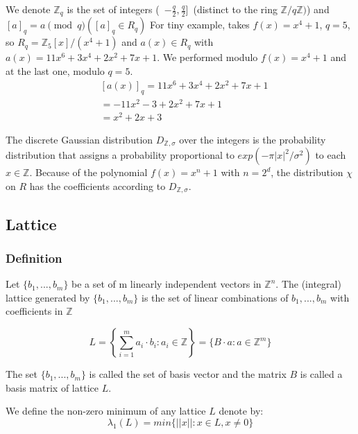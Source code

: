 \documentclass[A4paper,12pt]{article}
\begin{document}
We denote $\mathbb{Z}_q$ is the set of integers (\ $-\frac{q}{2},\frac{q}{2}$]\ (distinct to the ring $\mathbb{Z}/q\mathbb{Z})$) and $[a]_q = a \pmod q ([a]_q  \in R_q)$
For tiny example, takes $f(x) = x^4 + 1$, $q = 5$, so $R_q = \mathbb{Z}_5[x]/(x^4 + 1)$ and $a(x) \in R_q$ with $a(x) = 11x^6 + 3x^4 + 2x^2 + 7x + 1$. We performed modulo $f(x) = x^4 + 1$ and at the last one, modulo $q = 5$.
\begin{equation*}
	\begin{aligned}
	&[a(x)]_q = 11x^6 + 3x^4 + 2x^2 + 7x + 1\\
	&= -11x^2 -3 + 2x^2 + 7x + 1\\
	&= x^2 + 2x + 3
	\end{aligned}
\end{equation*}

The discrete Gaussian distribution $D_{\mathbb{Z}, \sigma}$ over the integers is the probability distribution that assigns a probability proportional to $exp(-\pi|x|^2/\sigma^2)$ to each $x \in \mathbb{Z}$. Because of the polynomial $f(x) = x^n + 1$ with $n = 2^d$, the distribution $\chi$ on $R$ has the coefficients according to $D_{\mathbb{Z}, \sigma}$.

\subsection{Lattice}

\subsubsection{Definition}
\begin{definition}[Lattice] Let $\{ b_1,...,b_m\}$ be a set of m linearly independent vectors in $\mathbb{Z}^n$. The (integral) lattice generated by $\{ b_1,...,b_m\}$ is the set of linear combinations of $b_1,...,b_m$ with coefficients in $\mathbb{Z}$
\end{definition}

\begin{equation*}
	L = \left \{ \sum_{i=1}^{m} a_i \cdot b_i: a_i \in \mathbb{Z} \right \} = \{B \cdot a : a \in \mathbb{Z}^m\}
\end{equation*}

The set $\{ b_1,...,b_m\}$  is called the set of basis vector and the matrix $B$ is called a basis matrix of lattice $L$.

We define the non-zero minimum of any lattice $L$ denote by:
\begin{equation*}
	\lambda_1(L) = min\{ ||x||: x \in L, x \neq 0 \}
\end{equation*}
\end{document}
